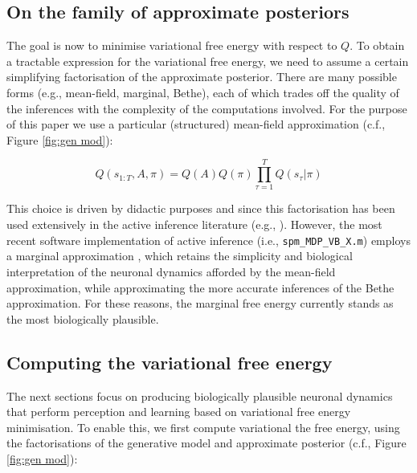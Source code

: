 \documentclass{article}
\begin{document}
\subsection{On the family of approximate posteriors}

The goal is now to minimise variational free energy with respect to $Q$. To obtain a tractable expression for the variational free energy, we need to assume a certain simplifying factorisation of the approximate posterior. There are many possible forms \cite{parrNeuronalMessagePassing2019,yedidiaConstructingFreeEnergyApproximations2005,heskesConvexityArgumentsEfficient2006} (e.g., mean-field, marginal, Bethe), each of which trades off the quality of the inferences with the complexity of the computations involved. For the purpose of this paper we use a particular (structured) mean-field approximation (c.f., Figure \ref{fig:gen mod}):
  		
  		\begin{equation}
  		\label{eq: mean field approx}
  		    Q(s_{1:T},A,\pi) = Q(A)Q(\pi) \prod_{\tau =1}^T Q(s_\tau|\pi)
  		\end{equation}
  		
This choice is driven by didactic purposes and since this factorisation has been used extensively in the active inference literature (e.g., \cite{fristonDeepTemporalModels2018,fristonGraphicalBrainBelief2017,fristonActiveInferenceProcess2017}). However, the most recent software implementation of active inference (i.e., \texttt{spm\_MDP\_VB\_X.m}) employs a marginal approximation \cite{parrNeuronalMessagePassing2019,parrComputationalNeurologyActive2019}, which retains the simplicity and biological interpretation of the neuronal dynamics afforded by the mean-field approximation, while approximating the more accurate inferences of the Bethe approximation. For these reasons, the marginal free energy currently stands as the most biologically plausible.

\subsection{Computing the variational free energy}

The next sections focus on producing biologically plausible neuronal dynamics that perform perception and learning based on variational free energy minimisation. To enable this, we first compute variational the free energy, using the factorisations of the generative model and approximate posterior (c.f., Figure \ref{fig:gen mod}):
\end{document}
